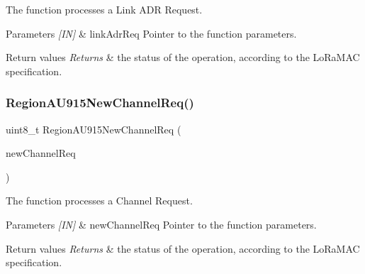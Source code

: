 The function processes a Link A\+DR Request. 


\begin{DoxyParams}{Parameters}
{\em \mbox{[}\+I\+N\mbox{]}} & link\+Adr\+Req Pointer to the function parameters.\\
\hline
\end{DoxyParams}

\begin{DoxyRetVals}{Return values}
{\em Returns} & the status of the operation, according to the Lo\+Ra\+M\+AC specification. \\
\hline
\end{DoxyRetVals}
\mbox{\label{group__REGIONAU915_gab50eb32c1a156ee9629976c7bf29967c}} 
\subsubsection{\texorpdfstring{Region\+A\+U915\+New\+Channel\+Req()}{RegionAU915NewChannelReq()}}
{\footnotesize\ttfamily uint8\+\_\+t Region\+A\+U915\+New\+Channel\+Req (\begin{DoxyParamCaption}\item[{\hyperlink{group__REGION_gae2abcdb6dbb843c9faf5fd3009eca9d6}{New\+Channel\+Req\+Params\+\_\+t} $\ast$}]{new\+Channel\+Req }\end{DoxyParamCaption})}



The function processes a Channel Request. 


\begin{DoxyParams}{Parameters}
{\em \mbox{[}\+I\+N\mbox{]}} & new\+Channel\+Req Pointer to the function parameters.\\
\hline
\end{DoxyParams}

\begin{DoxyRetVals}{Return values}
{\em Returns} & the status of the operation, according to the Lo\+Ra\+M\+AC specification. \\
\hline
\end{DoxyRetVals}
\mbox{\label{group__REGIONAU915_gaa729787fd4ca5a83011f6928c278f95f}} 

